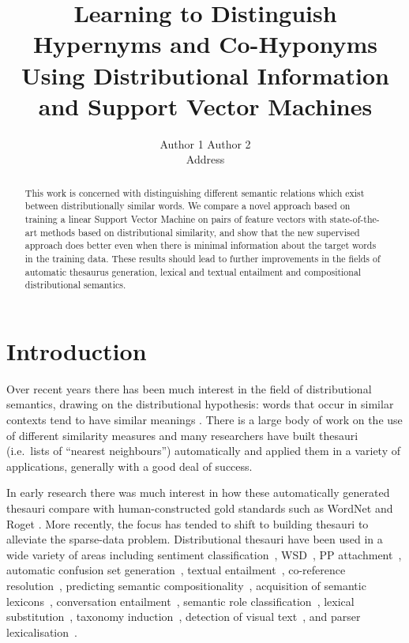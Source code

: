 \documentclass[11pt]{article}
\title{Learning to Distinguish Hypernyms and Co-Hyponyms Using Distributional Information and Support Vector Machines}
\author{Author 1 Author 2\\
Address}
\date{} %
\begin{document}
\maketitle

\begin{abstract}
This work is concerned with distinguishing different semantic relations which exist between distributionally similar words.  We compare a novel approach based on training a linear Support Vector Machine on pairs of feature vectors with state-of-the-art methods based on distributional similarity, and show that the new supervised approach does better even when there is minimal information about the target words in the training data.  These results should lead to further improvements in the fields of automatic thesaurus generation, lexical and textual entailment and compositional distributional semantics.
\end{abstract}
\section{Introduction}

Over recent years there has been much interest in the field of distributional semantics, drawing on the distributional hypothesis: words that occur in similar contexts tend to have similar meanings \cite{Harris1954}.   There is a large body of work on the use of different similarity measures \cite{Lee1999,Weeds2003,Curran2004} and many researchers have built thesauri (i.e.~lists of ``nearest neighbours'') automatically and applied them in a variety of applications, generally with a good deal of success.

In early research there was much interest in how these automatically generated thesauri compare with human-constructed gold standards such as WordNet and Roget \cite{Lin1998,Kilgarriff2000}.  More recently, the focus has tended to shift to building thesauri to alleviate the sparse-data problem.  Distributional thesauri have been used in a wide variety of areas including sentiment classification~\cite{Bollegala2011}, WSD~\cite{miller-EtAl:2012:PAPERS,khapra-EtAl:2010:ACL}, PP attachment~\cite{Calvo05distributionalthesaurus}, automatic confusion set generation~\cite{xue-hwa:2012:PAPERS}, textual entailment~\cite{berant-dagan-goldberger:2010:ACL}, co-reference resolution~\cite{lee-EtAl:2012:EMNLP-CoNLL}, predicting semantic compositionality~\cite{bergsma-EtAl:2010:EMNLP}, acquisition of semantic lexicons~\cite{mcintosh:2010:EMNLP}, conversation entailment~\cite{zhang-chai:2010:EMNLP}, semantic role classification~\cite{zapirain-EtAl:2010:NAACLHLT}, lexical substitution~\cite{szarvas-biemann-gurevych:2013:NAACL-HLT}, taxonomy induction~\cite{fountain-lapata:2012:NAACL-HLT}, detection of visual text~\cite{dodge-EtAl:2012:NAACL-HLT}, and parser lexicalisation~\cite{rei-briscoe:2013:NAACL-HLT}.  
\end{document}
